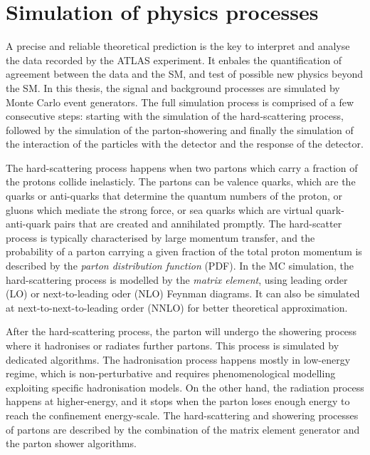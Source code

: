 \label{sec:DiHiggs:samples}



\section{Simulation of physics processes}
\label{sec:Simulation of physics processes}

A precise and reliable theoretical prediction is the key
to interpret and analyse the data recorded by the ATLAS experiment. 
It enbales the quantification of agreement between the data and the SM, 
and test of possible new physics beyond the SM. 
In this thesis, the signal and background processes are
simulated by Monte Carlo event generators.
The full simulation process is comprised of a few consecutive steps:
starting with the simulation of the hard-scattering process, 
followed by the simulation 
of the parton-showering and finally the simulation of 
the interaction of the particles with the detector and the 
response of the detector. 

The hard-scattering process happens when two partons which carry
a fraction of the protons collide inelasticly. 
The partons can be valence quarks, which are the quarks or anti-quarks
that determine the quantum numbers of the proton, or gluons 
which mediate the strong force, or sea quarks which are virtual 
quark-anti-quark pairs that are created and annihilated promptly. 
The hard-scatter process is typically characterised by large momentum 
transfer, 
and the probability of a parton carrying a given fraction of the total proton
momentum is described by the \textit{parton distribution function} (PDF).
In the MC simulation, the hard-scattering process is modelled by the
\textit{matrix element}, using leading order (LO) or next-to-leading oder (NLO)
Feynman diagrams. It can also be simulated at next-to-next-to-leading order (NNLO)
for better theoretical approximation. 

After the hard-scattering process, the parton will undergo the
showering process where it hadronises or radiates
further partons.
This process is simulated by dedicated algorithms. 
The hadronisation process happens mostly in low-energy regime,
which is non-perturbative and requires phenomenological modelling
exploiting specific hadronisation models. 
On the other hand, the radiation process happens at higher-energy, 
and it stops when the parton loses enough energy to reach the
confinement energy-scale.
The hard-scattering and showering processes of partons are 
described by the combination of the matrix element generator
and the parton shower algorithms. 

